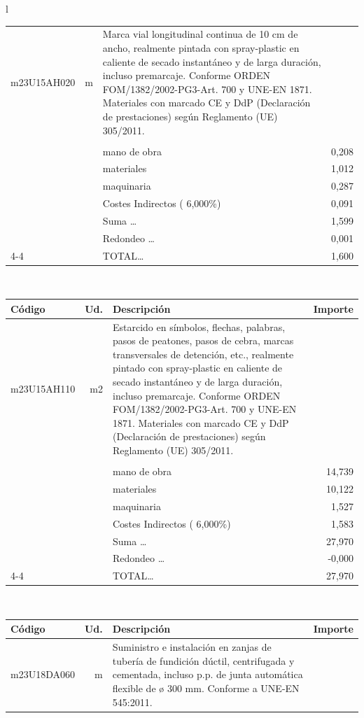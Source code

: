 \documentclass{book}%
\begin{document}
\begin{longtable}{l}
\begin{tabular}{l r p{60mm} r}
\hline%
m23U15AH020&m&Marca vial longitudinal continua de 10 cm de ancho, realmente pintada con spray{-}plastic en caliente de secado instantáneo y de larga duración, incluso premarcaje. Conforme ORDEN FOM/1382/2002{-}PG3{-}Art. 700 y UNE{-}EN 1871. Materiales con marcado CE y DdP (Declaración de prestaciones) según Reglamento (UE) 305/2011.&\\%
&&&\\%
&&mano de obra&     0,208\\%
&&materiales&     1,012\\%
&&maquinaria&     0,287\\%
&&Costes Indirectos (     6,000\%)&     0,091\\%
&&Suma \ldots&     1,599\\%
&&Redondeo \ldots&     0,001\\%
\cline{4-4}%
&&TOTAL\ldots&     1,600\\%
\end{tabular}\\%
\begin{tabular}{l r p{60mm} r}%
Código&Ud.&Descripción&Importe\\%
\hline%
m23U15AH110&m2&Estarcido en símbolos, flechas, palabras, pasos de peatones, pasos de cebra, marcas transversales de detención, etc., realmente pintado con spray{-}plastic en caliente de secado instantáneo y de larga duración, incluso premarcaje. Conforme ORDEN FOM/1382/2002{-}PG3{-}Art. 700 y UNE{-}EN 1871. Materiales con marcado CE y DdP (Declaración de prestaciones) según Reglamento (UE) 305/2011.&\\%
&&&\\%
&&mano de obra&    14,739\\%
&&materiales&    10,122\\%
&&maquinaria&     1,527\\%
&&Costes Indirectos (     6,000\%)&     1,583\\%
&&Suma \ldots&    27,970\\%
&&Redondeo \ldots&    {-}0,000\\%
\cline{4-4}%
&&TOTAL\ldots&    27,970\\%
\end{tabular}\\%
\begin{tabular}{l r p{60mm} r}%
Código&Ud.&Descripción&Importe\\%
\hline%
m23U18DA060&m&Suministro e instalación en zanjas de tubería de fundición dúctil, centrifugada y cementada, incluso p.p. de junta automática flexible de ø 300 mm. Conforme a UNE{-}EN 545:2011.&\\%

\end{tabular}
\end{longtable}
\end{document}
